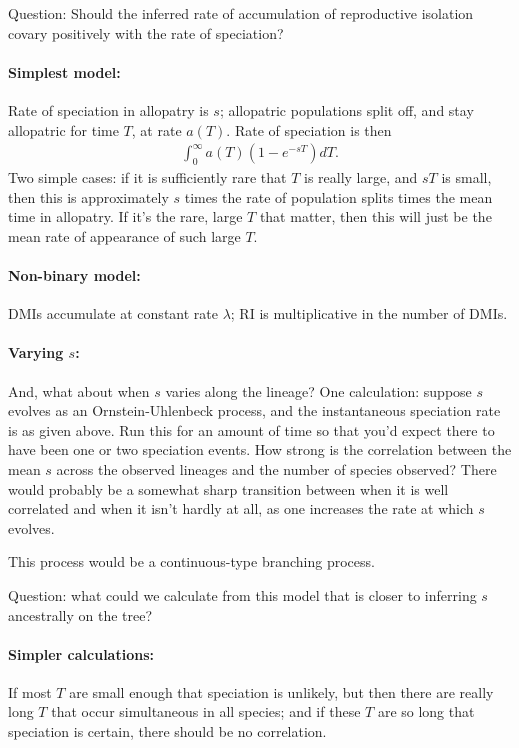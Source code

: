 \documentclass{article}
\begin{document}
Question: Should the inferred rate of accumulation of reproductive isolation covary positively with the rate of speciation?

\paragraph{Simplest model:} Rate of speciation in allopatry is $s$;
allopatric populations split off, and stay allopatric for time $T$, at rate $a(T)$.
Rate of speciation is then
\begin{align}
  \int_0^\infty a(T) (1-e^{-sT}) dT .
\end{align}
Two simple cases: if it is sufficiently rare that $T$ is really large,
and $sT$ is small, then this is approximately $s$ times the rate of population splits times the mean time in allopatry.
If it's the rare, large $T$ that matter, then this will just be the mean rate of appearance of such large $T$.


\paragraph{Non-binary model:} DMIs accumulate at constant rate $\lambda$;
RI is multiplicative in the number of DMIs.


\paragraph{Varying $s$:}
And, what about when $s$ varies along the lineage?
One calculation: suppose $s$ evolves as an Ornstein-Uhlenbeck process,
and the instantaneous speciation rate is as given above.
Run this for an amount of time so that you'd expect there to have been one or two speciation events.
How strong is the correlation between the mean $s$ across the observed lineages and the number of species observed?
There would probably be a somewhat sharp transition between when it is well correlated and when it isn't hardly at all, 
as one increases the rate at which $s$ evolves.

This process would be a continuous-type branching process.

Question: what could we calculate from this model that is closer to inferring $s$ ancestrally on the tree?

\paragraph{Simpler calculations:}
If most $T$ are small enough that speciation is unlikely,
but then there are really long $T$ that occur simultaneous in all species;
and if these $T$ are so long that speciation is certain,
there should be no correlation.
\end{document}
